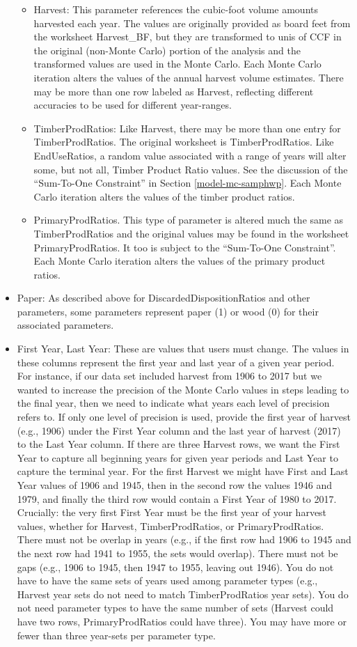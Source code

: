 \documentclass[
  openany]{book}
\begin{document}
\begin{itemize}
\begin{itemize}
  \item
    Harvest: This parameter references the cubic-foot volume amounts harvested each year. The values are originally provided as board feet from the worksheet Harvest\_BF, but they are transformed to unis of CCF in the original (non-Monte Carlo) portion of the analysis and the transformed values are used in the Monte Carlo. Each Monte Carlo iteration alters the values of the annual harvest volume estimates. There may be more than one row labeled as Harvest, reflecting different accuracies to be used for different year-ranges.
  \item
    TimberProdRatios: Like Harvest, there may be more than one entry for TimberProdRatios. The original worksheet is TimberProdRatios. Like EndUseRatios, a random value associated with a range of years will alter some, but not all, Timber Product Ratio values. See the discussion of the ``Sum-To-One Constraint'' in Section \ref{model-mc-samphwp}. Each Monte Carlo iteration alters the values of the timber product ratios.
  \item
    PrimaryProdRatios. This type of parameter is altered much the same as TimberProdRatios and the original values may be found in the worksheet PrimaryProdRatios. It too is subject to the ``Sum-To-One Constraint''. Each Monte Carlo iteration alters the values of the primary product ratios.
  \end{itemize}
\item
  Paper: As described above for DiscardedDispositionRatios and other parameters, some parameters represent paper (1) or wood (0) for their associated parameters.
\item
  First Year, Last Year: These are values that users must change. The values in these columns represent the first year and last year of a given year period. For instance, if our data set included harvest from 1906 to 2017 but we wanted to increase the precision of the Monte Carlo values in steps leading to the final year, then we need to indicate what years each level of precision refers to. If only one level of precision is used, provide the first year of harvest (e.g., 1906) under the First Year column and the last year of harvest (2017) to the Last Year column. If there are three Harvest rows, we want the First Year to capture all beginning years for given year periods and Last Year to capture the terminal year. For the first Harvest we might have First and Last Year values of 1906 and 1945, then in the second row the values 1946 and 1979, and finally the third row would contain a First Year of 1980 to 2017. Crucially: the very first First Year must be the first year of your harvest values, whether for Harvest, TimberProdRatios, or PrimaryProdRatios. There must not be overlap in years (e.g., if the first row had 1906 to 1945 and the next row had 1941 to 1955, the sets would overlap). There must not be gaps (e.g., 1906 to 1945, then 1947 to 1955, leaving out 1946). You do not have to have the same sets of years used among parameter types (e.g., Harvest year sets do not need to match TimberProdRatios year sets). You do not need parameter types to have the same number of sets (Harvest could have two rows, PrimaryProdRatios could have three). You may have more or fewer than three year-sets per parameter type.

\end{itemize}
\end{document}
